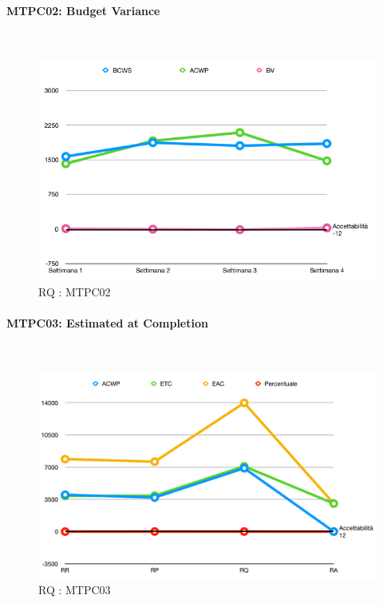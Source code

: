 \paragraph{MTPC02: Budget Variance}\-\\
\begin{figure}[H]
	\begin{center}
		\includegraphics[scale=0.5]{./images/grafici_RQ/MTPC02.png} 
	\end{center}
	\caption{RQ : MTPC02}
\end{figure}

\pagebreak

\paragraph{MTPC03: Estimated at Completion}\-\\
\begin{figure}[H]
	\begin{center}
		\includegraphics[scale=0.3]{./images/grafici_RQ/MTPC03.png} 
	\end{center}
	\caption{RQ : MTPC03}
\end{figure}

